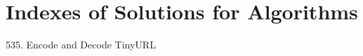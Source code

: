 \section*{Indexes of Solutions for Algorithms}
\label{sec:algo_ind}

535. Encode and Decode TinyURL\hfill\pageref{algo:535}

\newpage
